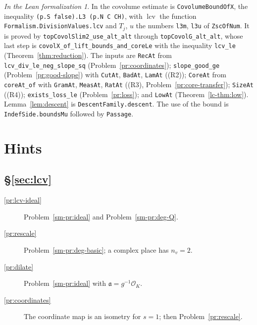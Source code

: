 \documentclass[reqno]{amsart}
\theoremstyle{definition}
\theoremstyle{plain}
\theoremstyle{remark}
\newtheorem*{leanremark}{In the Lean formalization}
\newcommand{\Oc}{\mathcal O}
\newcommand{\aaa}{\mathfrak a}
\newcommand{\lcv}{\operatorname{lcv}}
\newcommand{\tl}[1]{\texttt{#1}}
\begin{document}
\begin{leanremark}
\raggedright In \cite{Lean} the covolume estimate is \tl{CovolumeBoundOfX}, the inequality \tl{(p.S false).L3 (p.N C CH)}, with \(\lcv\) the function \tl{Formalism.\allowbreak{}DivisionValues.\allowbreak{}lcv} and \(T_j\), \(u\) the numbers \tl{l3m}, \tl{l3u} of \tl{ZscOfNum}.  It is proved by \tl{topCovolSlim2\_\allowbreak{}use\_\allowbreak{}alt\_\allowbreak{}alt} through \tl{topCovolG\_\allowbreak{}alt\_\allowbreak{}alt}, whose last step is \tl{covolX\_\allowbreak{}of\_\allowbreak{}lift\_\allowbreak{}bounds\_\allowbreak{}and\_\allowbreak{}coreLe} with the inequality \tl{lcv\_\allowbreak{}le} (Theorem~\ref{thm:reduction}).  The inputs are \tl{RecAt} from \tl{lcv\_\allowbreak{}div\_\allowbreak{}le\_\allowbreak{}neg\_\allowbreak{}slope\_\allowbreak{}sq} (Problem~\ref{pr:coordinates}); \tl{slope\_\allowbreak{}good\_\allowbreak{}ge} (Problem~\ref{pr:good-slope}) with \tl{CutAt}, \tl{BadAt}, \tl{LamAt} ((R2)); \tl{CoreAt} from \tl{coreAt\_\allowbreak{}of} with \tl{GramAt}, \tl{MeasAt}, \tl{RatAt} ((R3), Problem~\ref{pr:core-transfer}); \tl{SizeAt} ((R4)); \tl{exists\_\allowbreak{}loss\_\allowbreak{}le} (Problem~\ref{pr:loss}); and \tl{LowAt} (Theorem~\ref{lc-thm:low}).  Lemma~\ref{lem:descent} is \tl{DescentFamily.\allowbreak{}descent}.  The use of the bound is \tl{IndefSide.\allowbreak{}boundsMu} followed by \tl{Passage}.
\end{leanremark}

\section*{Hints}

\subsection*{\S\ref{sec:lcv}}
\begin{description}
\item[\ref{pr:lcv-ideal}] Problem~\ref{sm-pr:ideal} and Problem~\ref{sm-pr:deg-Q}.
\item[\ref{pr:rescale}] Problem~\ref{sm-pr:deg-basic}; a complex place has \(n_v = 2\).
\item[\ref{pr:dilate}] Problem~\ref{sm-pr:ideal} with \(\aaa = g^{-1}\Oc_K\).
\item[\ref{pr:coordinates}] The coordinate map is an isometry for \(s = 1\); then Problem~\ref{pr:rescale}.
\end{description}
\end{document}
